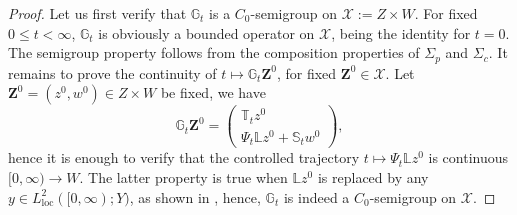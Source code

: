 \documentclass[10pt]{article}
\newcommand{\oploc}{\operatorname{loc}}
\begin{document}
\begin{proof}
Let us first verify that $\mathbb{G}_t$ is a $C_0$-semigroup on $\mathcal{X} := Z\times W$. For fixed $0 \leq t < \infty$, $\mathbb{G}_t$ is obviously a bounded operator on $\mathcal{X}$, being the identity for $t = 0$. The semigroup property follows from the composition properties of $\Sigma_p$ and $\Sigma_c$. It remains to prove the continuity of $t \mapsto \mathbb{G}_t \mathbf{Z}^0$, for fixed $\mathbf{Z}^0 \in \mathcal{X}$. Let $\mathbf{Z}^0 = (z^0,w^0) \in Z \times W$ be fixed, we have 
\[
\mathbb{G}_t \mathbf{Z}^0 = \left( \begin{array}{c}
    \mathbb{T}_t z^0 \\
    \Psi_t \mathbb{L} z^0 + \mathbb{S}_tw^0 
\end{array}\right),
\]
hence it is enough to verify that the controlled trajectory $t \mapsto \Psi_t \mathbb{L} z^0$ is continuous $[0,\infty) \to W$. The latter property is true when $\mathbb{L} z^0$ is replaced by any $y \in L^2_{\oploc}([0,\infty);Y)$, as shown in \cite[Proposition 2.3]{weiss_admissibility_control}, hence, $\mathbb{G}_t$ is indeed a $C_0$-semigroup on $\mathcal{X}$. 


\end{proof}
\end{document}
